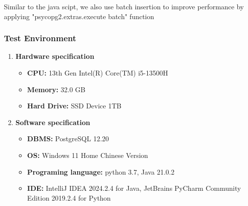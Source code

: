 \documentclass{article}
\begin{document}
Similar to the java scipt, we also use batch insertion to improve performance by applying 
"psycopg2.extras.execute batch" function




\subsubsection{Test Environment}
\begin{enumerate}
\item \textbf{Hardware specification}
\begin{itemize}
\item \textbf{CPU:} 13th Gen Intel(R) Core(TM) i5-13500H
\item \textbf{Memory:} 32.0 GB
\item \textbf{Hard Drive:} SSD Device 1TB
\end{itemize}
\item \textbf{Software specification}
\begin{itemize}
\item \textbf{DBMS:} PostgreSQL 12.20
\item \textbf{OS:} Windows 11 Home Chinese Version
\item \textbf{Programing language:} python 3.7, Java 21.0.2
\item \textbf{IDE:} IntelliJ IDEA 2024.2.4 for Java, JetBrains PyCharm Community Edition 2019.2.4 for Python
\end{itemize}
\end{enumerate}
\end{document}
